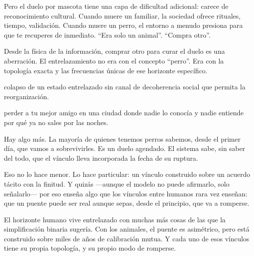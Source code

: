 Pero el duelo por mascota tiene una capa de dificultad adicional: carece de reconocimiento cultural. Cuando muere un familiar, la sociedad ofrece rituales, tiempo, validación. Cuando muere un perro, el entorno a menudo presiona para que te recuperes de inmediato. “Era solo un animal”. “Compra otro”.

Desde la física de la información, comprar otro para curar el duelo es una aberración. El entrelazamiento no era con el concepto “perro”. Era con la topología exacta y las frecuencias únicas de ese horizonte específico.

\begin{fisica}
 colapso de un estado entrelazado sin canal de decoherencia social que permita la reorganización.

 perder a tu mejor amigo en una ciudad donde nadie lo conocía y nadie entiende por qué ya no sales por las noches.
\end{fisica}
Hay algo más. La mayoría de quienes tenemos perros sabemos, desde el primer día, que vamos a sobrevivirles. Es un duelo agendado. El sistema sabe, sin saber del todo, que el vínculo lleva incorporada la fecha de su ruptura.

Eso no lo hace menor. Lo hace particular: un vínculo construido sobre un acuerdo tácito con la finitud. Y quizás —aunque el modelo no puede afirmarlo, solo señalarlo— por eso enseña algo que los vínculos entre humanos rara vez enseñan: que un puente puede ser real aunque sepas, desde el principio, que va a romperse.

El horizonte humano vive entrelazado con muchas más cosas de las que la simplificación binaria sugería. Con los animales, el puente es asimétrico, pero está construido sobre miles de años de calibración mutua. Y cada uno de esos vínculos tiene su propia topología, y su propio modo de romperse.

